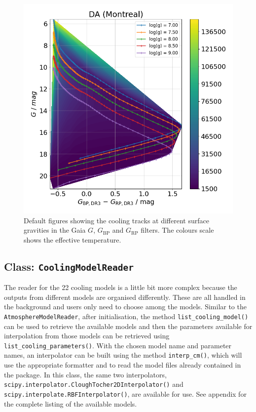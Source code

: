 \documentclass[fleqn,usenatbib]{rasti}
\begin{document}
\begin{figure}
    \centering
    \includegraphics[width=\columnwidth]{DA_cooling_tracks_from_plotter.png}
    \caption{Default figures showing the cooling tracks at different surface
    gravities in the Gaia $G$, $G_{\mathrm{BP}}$ and $G_{\mathrm{RP}}$ filters.
    The colours scale shows the effective temperature.}
    \label{fig:cooling_tracks_default}
\end{figure}

\subsection{Class: \texttt{CoolingModelReader}}
The reader for the 22 cooling models is a little bit more complex because
the outputs from different models are organised differently. These are all
handled in the background and users only need to choose among the models.
Similar to the \verb+AtmosphereModelReader+, after initialisation, the
method \verb+list_cooling_model()+ can be used to retrieve the available models
and then the parameters available for interpolation from those models
can be retrieved using \verb+list_cooling_parameters()+. With the chosen
model name and parameter names, an interpolator can be built using the method
\verb+interp_cm()+, which will use the appropriate formatter and to read
the model files already contained in the package. In this class, the same two
interpolators, \verb+scipy.interpolator.CloughTocher2DInterpolator()+ and 
\verb+scipy.interpolate.RBFInterpolator()+, are available for use. See appendix
for the complete listing of the available models.
\end{document}
